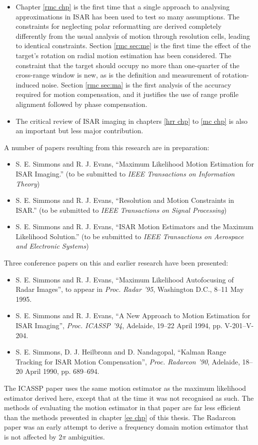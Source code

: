 \begin{itemize}
\item Chapter \ref{rmc chp} is the first time that a single approach to
analysing approximations in ISAR has been used to test so many assumptions.
The constraints for neglecting polar reformatting are derived completely
differently from the usual analysis of motion through resolution cells,
leading to identical constraints.  Section \ref{rmc sec:me} is the first
time the effect of the target's rotation on radial motion estimation has
been considered.  The constraint that the target should occupy no more than
one-quarter of the cross-range window is new, as is the definition and
measurement of rotation-induced noise.  Section \ref{rmc sec:ma} is the
first analysis of the accuracy required for motion compensation, and it
justifies the use of range profile alignment followed by phase compensation.

\item The critical review of ISAR imaging in chapters \ref{hrr chp} to
\ref{mc chp} is also an important but less major contribution.
\end{itemize}

\noindent A number of papers resulting from this research are in preparation:
\begin{itemize}
\item S. E. Simmons and R. J. Evans, ``Maximum Likelihood Motion Estimation
for ISAR Imaging.'' (to be submitted to {\em IEEE Transactions on
Information Theory})
\item S. E. Simmons and R. J. Evans, ``Resolution and Motion Constraints in
ISAR.'' (to be submitted to {\em IEEE Transactions on
Signal Processing})
\item S. E. Simmons and R. J. Evans, ``ISAR Motion Estimators and the
Maximum Likelihood Solution.'' (to be submitted to {\em IEEE Transactions on
Aerospace and Electronic Systems})
\end{itemize}

\noindent Three conference papers on this and earlier research have been presented:
\begin{itemize}
\item S. E. Simmons and R. J. Evans, ``Maximum Likelihood Autofocusing of
Radar Images'', to appear in {\em Proc. Radar '95\/}, Washington D.C., 
8--11 May 1995.
\item S. E. Simmons and R. J. Evans, ``A New Approach to Motion Estimation
for ISAR Imaging'', {\em Proc. ICASSP '94\/}, Adelaide, 19--22 April 1994,
pp. V-201--V-204.
\item S. E. Simmons, D. J. Heilbronn and D. Nandagopal,	``Kalman Range 
Tracking for ISAR Motion Compensation'', {\em Proc. Radarcon '90\/},
Adelaide, 18--20 April 1990, pp. 689--694.
\end{itemize}
The ICASSP paper uses the same motion estimator as the maximum likelihood
estimator derived here, except that at the time it was not recognised as
such.  The methods of evaluating the motion estimator in that paper are far
less efficient than the methods presented in chapter \ref{ee chp} of this
thesis.  The Radarcon paper was an early attempt to derive a frequency
domain motion estimator that is not affected by $2\pi$ ambiguities.

